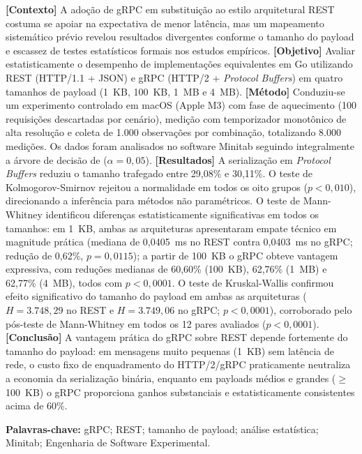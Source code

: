 \documentclass[a4paper, 12pt]{article}
\begin{document}
{\small\noindent
\textbf{[Contexto]} A adoção de gRPC em substituição ao estilo arquitetural REST costuma se apoiar na expectativa de menor latência, mas um mapeamento sistemático prévio revelou resultados divergentes conforme o tamanho do payload e escassez de testes estatísticos formais nos estudos empíricos. \textbf{[Objetivo]} Avaliar estatisticamente o desempenho de implementações equivalentes em Go utilizando REST (HTTP/1.1 + JSON) e gRPC (HTTP/2 + \textit{Protocol Buffers}) em quatro tamanhos de payload (1~KB, 100~KB, 1~MB e 4~MB). \textbf{[Método]} Conduziu-se um experimento controlado em macOS (Apple M3) com fase de aquecimento (100 requisições descartadas por cenário), medição com temporizador monotônico de alta resolução e coleta de 1.000 observações por combinação, totalizando 8.000 medições. Os dados foram analisados no software Minitab seguindo integralmente a árvore de decisão de  ($\alpha = 0{,}05$). \textbf{[Resultados]} A serialização em \textit{Protocol Buffers} reduziu o tamanho trafegado entre 29,08\% e 30,11\%. O teste de Kolmogorov-Smirnov rejeitou a normalidade em todos os oito grupos ($p < 0{,}010$), direcionando a inferência para métodos não paramétricos. O teste de Mann-Whitney identificou diferenças estatisticamente significativas em todos os tamanhos: em 1~KB, ambas as arquiteturas apresentaram empate técnico em magnitude prática (mediana de 0,0405~ms no REST contra 0,0403~ms no gRPC; redução de 0,62\%, $p = 0{,}0115$); a partir de 100~KB o gRPC obteve vantagem expressiva, com reduções medianas de 60,60\% (100~KB), 62,76\% (1~MB) e 62,77\% (4~MB), todos com $p < 0{,}0001$. O teste de Kruskal-Wallis confirmou efeito significativo do tamanho do payload em ambas as arquiteturas ($H = 3.748{,}29$ no REST e $H = 3.749{,}06$ no gRPC; $p < 0{,}0001$), corroborado pelo pós-teste de Mann-Whitney em todos os 12 pares avaliados ($p < 0{,}0001$). \textbf{[Conclusão]} A vantagem prática do gRPC sobre REST depende fortemente do tamanho do payload: em mensagens muito pequenas (1~KB) sem latência de rede, o custo fixo de enquadramento do HTTP/2/gRPC praticamente neutraliza a economia da serialização binária, enquanto em payloads médios e grandes ($\ge$ 100~KB) o gRPC proporciona ganhos substanciais e estatisticamente consistentes acima de 60\%.\par}

\vspace{10pt}

{\small\noindent\textbf{Palavras-chave:} gRPC; REST; tamanho de payload; análise estatística; Minitab; Engenharia de Software Experimental.\par}
\end{document}
